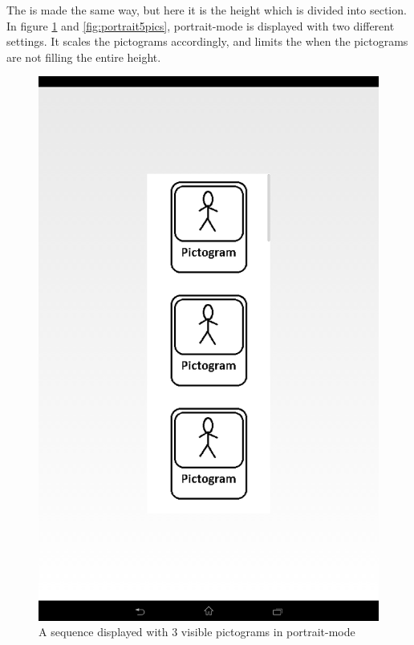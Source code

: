 The  is made the same way, but here it is the height which is divided into section. In figure \ref{fig:portrait3pics} and \ref{fig:portrait5pics}, portrait-mode is displayed with two different settings. It scales the pictograms accordingly, and limits the  when the pictograms are not filling the entire height.

\begin{figure}[ht!]
\centering
\begin{minipage}{.45\textwidth}
\centering
\includegraphics[scale=0.1]{Pics/Sprint3/portrait3pics.png}
\caption{A sequence displayed with 3 visible pictograms in portrait-mode}
\label{fig:portrait3pics}
\end{minipage}\hfill

\end{figure}
